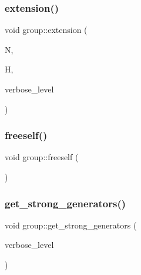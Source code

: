 \mbox{\label{classgroup_a798cd01cad4d5616b67fa456b8b04008}} 
\subsubsection{\texorpdfstring{extension()}{extension()}}
{\footnotesize\ttfamily void group\+::extension (\begin{DoxyParamCaption}\item[{\mbox{\hyperlink{classgroup}{group}} \&}]{N,  }\item[{\mbox{\hyperlink{classgroup}{group}} \&}]{H,  }\item[{\mbox{\hyperlink{galois_8h_a09fddde158a3a20bd2dcadb609de11dc}{I\+NT}}}]{verbose\+\_\+level }\end{DoxyParamCaption})}

\mbox{\label{classgroup_a43d679f29a588271c1eaeefe94bed282}} 
\subsubsection{\texorpdfstring{freeself()}{freeself()}}
{\footnotesize\ttfamily void group\+::freeself (\begin{DoxyParamCaption}{ }\end{DoxyParamCaption})}

\mbox{\label{classgroup_ad1c87ec4beae45f2acdcf57b754d5617}} 
\subsubsection{\texorpdfstring{get\+\_\+strong\+\_\+generators()}{get\_strong\_generators()}}
{\footnotesize\ttfamily void group\+::get\+\_\+strong\+\_\+generators (\begin{DoxyParamCaption}\item[{\mbox{\hyperlink{galois_8h_a09fddde158a3a20bd2dcadb609de11dc}{I\+NT}}}]{verbose\+\_\+level }\end{DoxyParamCaption})}

\mbox{\label{classgroup_a2d70bcf6a1495e7fb8e16ba7dfadb725}} 
